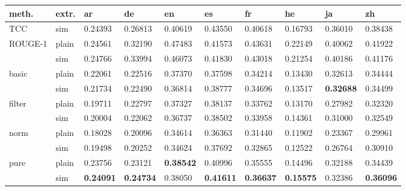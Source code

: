 \begin{tabular}{llllllllll}
	
\hline\hline
meth. & extr. & ar & de & en & es & fr & he & ja & zh\\
\hline\hline

TCC & sim & 0.24393 & 0.26813 & 0.40619 & 0.43550 & 0.40618 & 0.16793 & 0.36010 & 0.38438\\
ROUGE-1 & plain & 0.24561 & 0.32190 & 0.47483 & 0.41573 & 0.43631 & 0.22149 & 0.40062 & 0.41922\\
& sim & 0.24766 & 0.33994 & 0.46073 & 0.41830 & 0.43018 & 0.21254 & 0.40186 & 0.41176\\
\hline
basic & plain & 0.22061 & 0.22516 & 0.37370 & 0.37598 & 0.34214 & 0.13430 & 0.32613 & 0.34444\\
& sim & 0.21734 & 0.22490 & 0.36814 & 0.38777 & 0.34696 & 0.13517 & \textbf{0.32688} & 0.34499\\

filter & plain & 0.19711 & 0.22797 & 0.37327 & 0.38137 & 0.33762 & 0.13170 & 0.27982 & 0.32320\\
& sim & 0.20004 & 0.22062 & 0.36737 & 0.38502 & 0.33958 & 0.14361 & 0.31000 & 0.32549\\

norm & plain & 0.18028 & 0.20096 & 0.34614 & 0.36363 & 0.31440 & 0.11902 & 0.23367 & 0.29961\\
& sim & 0.19498 & 0.20252 & 0.34624 & 0.37692 & 0.32865 & 0.12522 & 0.26764 & 0.30910\\

pure & plain & 0.23756 & 0.23121 & \textbf{0.38542} & 0.40996 & 0.35555 & 0.14496 & 0.32188 & 0.34439\\
& sim & \textbf{0.24091} & \textbf{0.24734} & 0.38050 & \textbf{0.41611} & \textbf{0.36637} & \textbf{0.15575} & 0.32386 & \textbf{0.36096}\\

\hline\hline
\end{tabular} 
